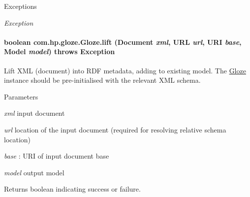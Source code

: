 \begin{DoxyExceptions}{Exceptions}
\item[{\em Exception}]\end{DoxyExceptions}
\hypertarget{classcom_1_1hp_1_1gloze_1_1_gloze_a18b281e8a93da94ddd22666333cf0f06}{
\paragraph[{lift}]{\setlength{\rightskip}{0pt plus 5cm}boolean com.hp.gloze.Gloze.lift (Document {\em xml}, \/  URL {\em url}, \/  URI {\em base}, \/  Model {\em model})  throws Exception }\hfill}
\label{classcom_1_1hp_1_1gloze_1_1_gloze_a18b281e8a93da94ddd22666333cf0f06}
Lift XML (document) into RDF metadata, adding to existing model. The \hyperlink{classcom_1_1hp_1_1gloze_1_1_gloze}{Gloze} instance should be pre-\/initialised with the relevant XML schema. 
\begin{DoxyParams}{Parameters}
\item[{\em xml}]input document \item[{\em url}]location of the input document (required for resolving relative schema location) \item[{\em base}]: URI of input document base \item[{\em model}]output model \end{DoxyParams}
\begin{DoxyReturn}{Returns}
boolean indicating success or failure. 
\end{DoxyReturn}

